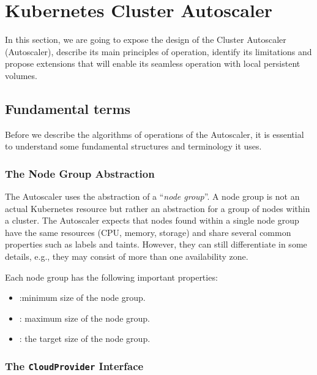 \section{Kubernetes Cluster Autoscaler}
\label{section:autoscaler}

In this section, we are going to expose the design of the Cluster Autoscaler
(Autoscaler), describe its main principles of operation, identify its
limitations and propose extensions that will enable its seamless operation with
local persistent volumes.


\subsection{Fundamental terms}

Before we describe the algorithms of operations of the Autoscaler, it is
essential to understand some fundamental structures and terminology it uses.

\subsubsection{The Node Group Abstraction}

The Autoscaler uses the abstraction of a ``\textit{node group}''. A node group
is not an actual Kubernetes resource but rather an abstraction for a group of
nodes within a cluster. The Autoscaler expects that nodes found within a single
node group have the same resources (CPU, memory, storage) and share several
common properties such as labels and taints. However, they can still
differentiate in some details, e.g., they may consist of more than one
availability zone.

Each node group has the following important properties:
\begin{itemize}
      \tightlist
      \item {}:minimum size of the node group.
      \item  {}: maximum size of the node group.
      \item  {}: the target size of the node group.
\end{itemize}


\subsubsection{The \texttt{CloudProvider} Interface}

